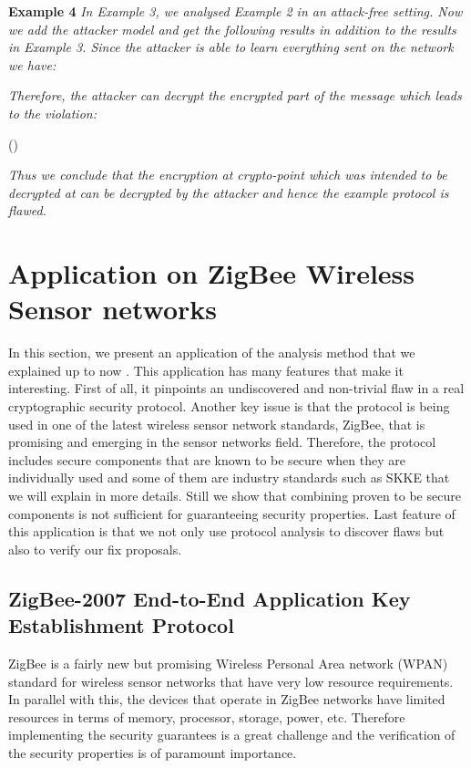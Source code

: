\textbf{Example 4}  \textit{In Example 3, we analysed Example 2 in an attack-free setting. Now we add the attacker model and get the following results in addition to the results in Example 3. Since the attacker is able to learn everything sent on the network we have:}
\begin{center} \end{center}
\textit{Therefore, the attacker can decrypt the encrypted part of the message which leads to the violation:}
\begin{center}() \end{center}
\textit{Thus we conclude that the encryption at crypto-point  which was intended to be decrypted at  can be decrypted by the attacker and hence the example protocol is flawed.}
\section{Application on ZigBee Wireless Sensor networks}
In this section, we present an application of the analysis method that
we explained up to now \cite{yuk:nie:2009}. This application has many features that make
it interesting. First of all, it pinpoints an undiscovered and
non-trivial flaw in a
real cryptographic security protocol. Another key issue is that the
protocol is being used in one of the latest wireless sensor network
standards, ZigBee, that is promising and emerging in the sensor
networks field. Therefore, the protocol includes secure components
that are known to be secure when they are individually used and some
of them are industry standards such as SKKE that we will explain in
more details. Still we show that combining proven to be secure
components is not sufficient for guaranteeing security
properties. Last feature of this application is that we not only use
protocol analysis to discover flaws but also to verify our fix
proposals. 

\subsection{ZigBee-2007 End-to-End Application Key Establishment Protocol}
\label{zig:keyest}
ZigBee is a fairly new but promising Wireless Personal Area network (WPAN) standard for wireless sensor
networks
that have very low resource requirements. In parallel with this, the devices that operate in
ZigBee networks have limited resources in terms of memory, processor,
storage, power, etc. Therefore
implementing the security guarantees is a great challenge and the
verification of the security properties is of paramount importance.

